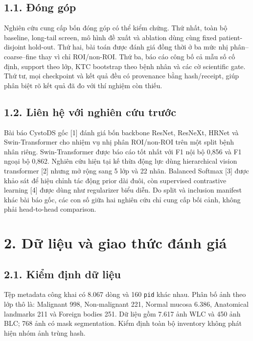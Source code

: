 \documentclass[
  10pt,
  a4paper,
  twocolumn]{article}
\begin{document}
\subsection{1.1. Đóng góp}\label{ux111uxf3ng-guxf3p}

Nghiên cứu cung cấp bốn đóng góp có thể kiểm chứng. Thứ nhất, toàn bộ
baseline, long-tail screen, mô hình đề xuất và ablation dùng cùng fixed
patient-disjoint hold-out. Thứ hai, bài toán được đánh giá đồng thời ở
ba mức nhị phân--coarse--fine thay vì chỉ ROI/non-ROI. Thứ ba, báo cáo
công bố cả mẫu số cố định, support theo lớp, KTC bootstrap theo bệnh
nhân và các cờ scientific gate. Thứ tư, mọi checkpoint và kết quả đều có
provenance bằng hash/receipt, giúp phân biệt rõ kết quả đã đo với thí
nghiệm còn thiếu.

\subsection{1.2. Liên hệ với nghiên cứu
trước}\label{liuxean-hux1ec7-vux1edbi-nghiuxean-cux1ee9u-trux1b0ux1edbc}

Bài báo CystoDS gốc {[}1{]} đánh giá bốn backbone ResNet, ResNeXt, HRNet
và Swin-Transformer cho nhiệm vụ nhị phân ROI/non-ROI trên một split
bệnh nhân riêng. Swin-Transformer được báo cáo tốt nhất với F1 nội bộ
0,856 và F1 ngoại bộ 0,862. Nghiên cứu hiện tại kế thừa động lực dùng
hierarchical vision transformer {[}2{]} nhưng mở rộng sang 5 lớp và 22
nhãn. Balanced Softmax {[}3{]} được khảo sát để hiệu chỉnh tác động
prior dài đuôi, còn supervised contrastive learning {[}4{]} được dùng
như regularizer biểu diễn. Do split và inclusion manifest khác bài báo
gốc, các con số giữa hai nghiên cứu chỉ cung cấp bối cảnh, không phải
head-to-head comparison.

\section{2. Dữ liệu và giao thức đánh
giá}\label{dux1eef-liux1ec7u-vuxe0-giao-thux1ee9c-ux111uxe1nh-giuxe1}

\subsection{2.1. Kiểm định dữ
liệu}\label{kiux1ec3m-ux111ux1ecbnh-dux1eef-liux1ec7u}

Tệp metadata công khai có 8.067 dòng và 160 \texttt{pid} khác nhau. Phân
bố ảnh theo lớp thô là: Malignant 998, Non-malignant 221, Normal mucosa
6.386, Anatomical landmarks 211 và Foreign bodies 251. Dữ liệu gồm 7.617
ảnh WLC và 450 ảnh BLC; 768 ảnh có mask segmentation. Kiểm định toàn bộ
inventory không phát hiện nhóm ảnh trùng hash.
\end{document}
